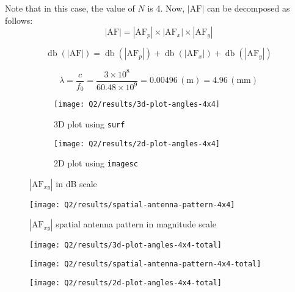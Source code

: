 \documentclass[12pt,onecolumn,a4paper]{article}
\begin{document}
	Note that in this case, the value of $N$ is 4.
	Now, $|\text{AF}| $ can be decomposed as follows:
	\begin{equation}
		|\text{AF}| = |\text{AF}_p| \times |\text{AF}_x| \times |\text{AF}_y|
	\end{equation}
	
	
	\begin{equation}
		\operatorname{db}(|\text{AF}|) = \operatorname{db}(|\text{AF}_p|) + \operatorname{db}(|\text{AF}_x|) + \operatorname{db}(|\text{AF}_y|)
	\end{equation}
	
	
	\begin{equation}
		\lambda = \frac{c}{f_0} = \frac{3 \times 10^8}{60.48 \times 10^9} = 0.00496 \, (\mathrm{m}) = 4.96 \, (\mathrm{mm})
	\end{equation}

\begin{figure}[H]
		\begin{subfigure}{.5\linewidth}
		\centering
		\texttt{[image: Q2/results/3d-plot-angles-4x4]}
		\caption{3D plot using \texttt{surf}}
		\label{fig:3d-plot-angles-4x4}
	\end{subfigure}
	\hfill
	\begin{subfigure}{.5\linewidth}
		\centering
		\texttt{[image: Q2/results/2d-plot-angles-4x4]}
		\caption{2D plot using \texttt{imagesc}}
		\label{fig:2d-plot-angles-4x4}
	\end{subfigure}
	\caption{$|\text{AF}_{xy}|$ in dB scale}
\end{figure}
	
	\begin{figure}[H]
		\centering
		\texttt{[image: Q2/results/spatial-antenna-pattern-4x4]}
		\caption{$|\text{AF}_{xy}|$ spatial antenna pattern in magnitude scale}
		\label{fig:spatial-antenna-pattern-4x4}
	\end{figure}

	
\begin{figure}[H]
	\centering
	\texttt{[image: Q2/results/3d-plot-angles-4x4-total]}
	\caption{}
	\label{fig:3d-plot-angles-4x4-total}
\end{figure}
\begin{figure}[H]
	\centering
	\texttt{[image: Q2/results/spatial-antenna-pattern-4x4-total]}
	\caption{}
	\label{fig:spatial-antenna-pattern-4x4-total}
\end{figure}
\begin{figure}[H]
	\centering
	\texttt{[image: Q2/results/2d-plot-angles-4x4-total]}
	\caption{}
	\label{fig:2d-plot-angles-4x4-total}
\end{figure}
\end{document}
